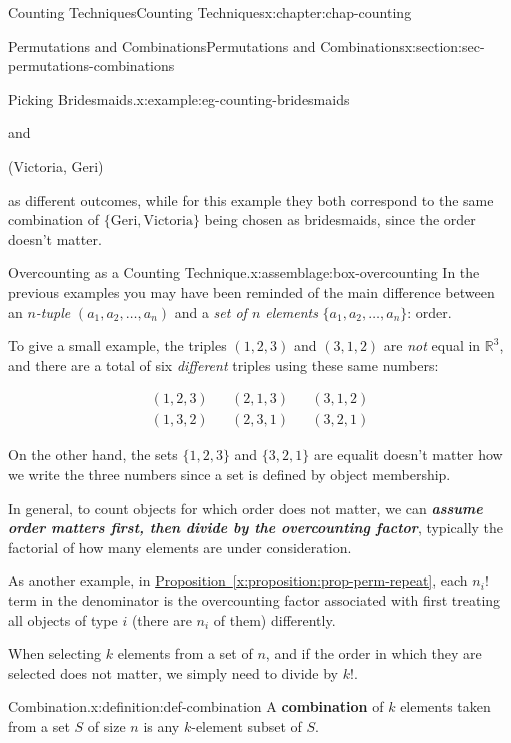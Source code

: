 \documentclass[oneside,10pt,]{book}
\newcommand{\xreffont}{\relax}
\newcommand{\alert}[1]{\textbf{\textit{#1}}}
\newcommand{\terminology}[1]{\textbf{#1}}
\numberwithin{equation}{section}
\newcommand{\amp}{&}
\begin{document}
\begin{chapterptx}{Counting Techniques}{}{Counting Techniques}{}{}{x:chapter:chap-counting}
\begin{sectionptx}{Permutations and Combinations}{}{Permutations and Combinations}{}{}{x:section:sec-permutations-combinations}
\begin{example}{Picking Bridesmaids.}{x:example:eg-counting-bridesmaids}
\begin{sidebyside}{3}{0.2}{0.2}{0}
\begin{sbspanel}{0.1}
and%
\end{sbspanel}%
\begin{sbspanel}{0.25}%
\par
(Victoria, Geri)%
\end{sbspanel}%
\end{sidebyside}%
\par
as different outcomes, while for this example they both correspond to the same combination of \(\{\text{Geri}, \text{Victoria}\}\) being chosen as bridesmaids, since the order doesn't matter.%
\end{example}
\begin{assemblage}{Overcounting as a Counting Technique.}{x:assemblage:box-overcounting}%
In the previous examples you may have been reminded of the main difference between an \emph{\(n\)-tuple} \((a_1,a_2,\ldots,a_n)\) and a \emph{set of \(n\) elements} \(\{a_1,a_2,\ldots,a_n\}\): order.%
\par
To give a small example, the triples \((1,2,3)\) and \((3,1,2)\) are \emph{not} equal in \(\mathbb{R}^3\), and there are a total of six \emph{different} triples using these same numbers:%
\par
%
\begin{align*}
(1,2,3) \amp \amp (2,1,3) \amp \amp (3,1,2)\\
(1,3,2) \amp \amp (2,3,1) \amp \amp (3,2,1)
\end{align*}
%
\par
On the other hand, the sets \(\{1,2,3\}\) and \(\{3,2,1\}\) are equal\textemdash{}it doesn't matter how we write the three numbers since a set is defined by object membership.%
\par
In general, to count objects for which order does not matter, we can \alert{assume order matters first, then divide by the overcounting factor}, typically the factorial of how many elements are under consideration.%
\par
As another example, in \hyperref[x:proposition:prop-perm-repeat]{Proposition~{\xreffont\ref{x:proposition:prop-perm-repeat}}}, each \(n_i!\) term in the denominator is the overcounting factor associated with first treating all objects of type \(i\) (there are \(n_i\) of them) differently.%
\end{assemblage}
When selecting \(k\) elements from a set of \(n\), and if the order in which they are selected does not matter, we simply need to divide by \(k!\).%
\begin{definition}{Combination.}{x:definition:def-combination}%
\label{g:notation:id417644} A \terminology{combination} of \(k\) elements taken from a set \(S\) of size \(n\) is any \(k\)-element subset of \(S\).%

\end{definition}
\end{sectionptx}
\end{chapterptx}
\end{document}
